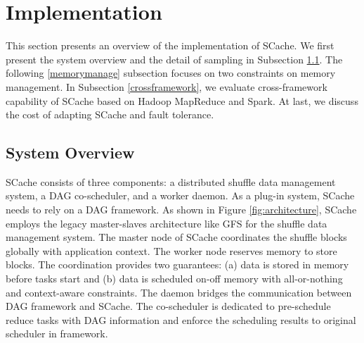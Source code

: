\section{Implementation}\label{impl}
This section presents an overview of the implementation of SCache. 
{\color{blue}
We first present the system overview and the detail of sampling in Subsection \ref{arch}. 
The following \ref{memorymanage} subsection focuses on two constraints on memory management.
In Subsection \ref{crossframework}, we evaluate cross-framework capability of SCache based on Hadoop MapReduce and Spark. 
At last, we discuss the cost of adapting SCache and fault tolerance. 
}


\subsection{System Overview}\label{arch}
SCache consists of three components: a distributed shuffle data management system, a DAG co-scheduler, and a %
{\color{blue} worker daemon. As a plug-in system, SCache needs to rely on a DAG framework.} As shown in Figure \ref{fig:architecture}, SCache employs the legacy master-slaves architecture like GFS \cite{gfs} for the shuffle data management system. 
The master node of SCache coordinates the shuffle blocks globally with application context. The worker node reserves memory to store blocks.
The coordination provides two guarantees: (a) data is stored in memory before tasks start and (b) data is scheduled on-off memory with all-or-nothing and context-aware constraints. 
The daemon bridges the communication between %
{\color{blue} DAG framework} and SCache. The co-scheduler is dedicated to pre-schedule reduce tasks with DAG information and enforce the scheduling results to %
 {\color{blue} original scheduler in framework}.



